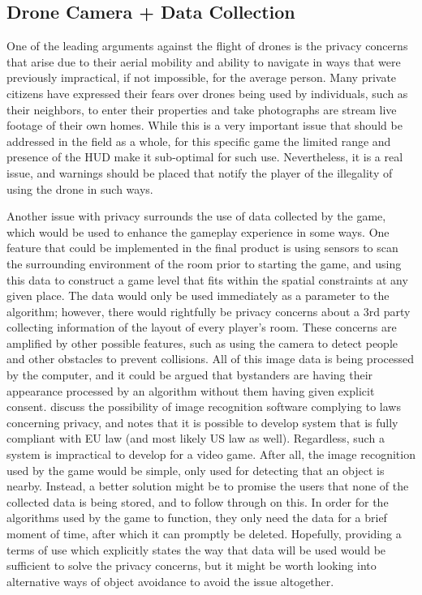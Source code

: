 \documentclass[10pt,twocolumn]{article}
\begin{document}
\subsection{Drone Camera + Data Collection}

One of the leading arguments against the flight of drones is the privacy concerns that arise due to their aerial mobility and ability to navigate in ways that were previously impractical, if not impossible, for the average person. Many private citizens have expressed their fears over drones being used by individuals, such as their neighbors, to enter their properties and take photographs are stream live footage of their own homes. While this is a very important issue that should be addressed in the field as a whole, for this specific game the limited range and presence of the HUD make it sub-optimal for such use. Nevertheless, it is a real issue, and warnings should be placed that notify the player of the illegality of using the drone in such ways.

Another issue with privacy surrounds the use of data collected by the game, which would be used to enhance the gameplay experience in some ways. One feature that could be implemented in the final product is using sensors to scan the surrounding environment of the room prior to starting the game, and using this data to construct a game level that fits within the spatial constraints at any given place. The data would only be used immediately as a parameter to the algorithm; however, there would rightfully be privacy concerns about a 3rd party collecting information of the layout of every player's room. These concerns are amplified by other possible features, such as using the camera to detect people and other obstacles to prevent collisions. All of this image data is being processed by the computer, and it could be argued that bystanders are having their appearance processed by an algorithm without them having given explicit consent. \citeauthor{CameraPrivacy}\cite{CameraPrivacy} discuss the possibility of image recognition software complying to laws concerning privacy, and notes that it is possible to develop system that is fully compliant with EU law (and most likely US law as well). Regardless, such a system is impractical to develop for a video game. After all, the image recognition used by the game would be simple, only used for detecting that an object is nearby. Instead, a better solution might be to promise the users that none of the collected data is being stored, and to follow through on this. In order for the algorithms used by the game to function, they only need the data for a brief moment of time, after which it can promptly be deleted. Hopefully, providing a terms of use which explicitly states the way that data will be used would be sufficient to solve the privacy concerns, but it might be worth looking into alternative ways of object avoidance to avoid the issue altogether.
\end{document}
